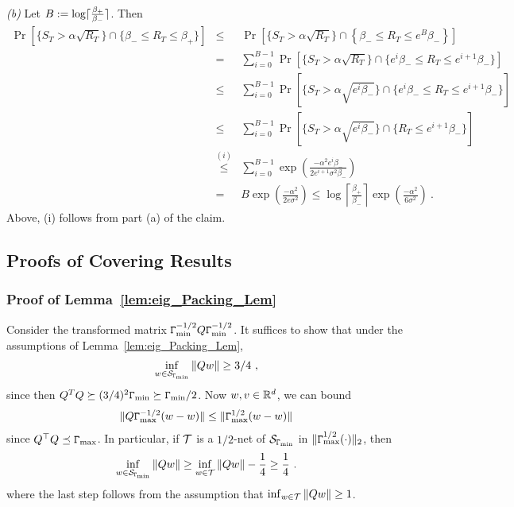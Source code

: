 	\emph{(b) }  Let $B := \log\lceil\frac{\beta_+}{\beta_-}\rceil$. Then
		\begin{eqnarray*}
		\Pr\left[\{S_T > \alpha\sqrt{R_T}\} \cap \{\beta_- \le R_T \le \beta_+\}\right] &\le& \Pr\left[\{S_T > \alpha\sqrt{R_T}\} \cap \left\{\beta_- \le R_T \le e^B\beta_- \right\}\right]\\
		&=& \sum_{i=0}^{B-1}\Pr[\{S_T > \alpha\sqrt{R_T}\} \cap \{e^i\beta_- \le R_T \le e^{i + 1}\beta_-\}]\\
		&\le& \sum_{i=0}^{B-1}\Pr[\{S_T > \alpha\sqrt{e^{i}\beta_-}\} \cap \{e^{i} \beta_- \le R_T \le e^{i+1}\beta_- \}]\\
		&\le& \sum_{i=0}^{B-1}\Pr[\{S_T > \alpha\sqrt{e^{i}\beta_-}\} \cap \{R_T \le e^{i+1}\beta_- \}]\\
	  &\stackrel{(i)}{\le}& \sum_{i=0}^{B-1}\exp\left(\frac{-\alpha^2 e^i\beta_-}{2e^{i + 1}\sigma^2\beta_-}\right)\\
		&=& B\exp\left(\frac{-\alpha^2}{2e \sigma^2}\right) \leq  \log\left\lceil\frac{\beta_+}{\beta_-} \right \rceil \exp\left(\frac{-\alpha^2}{ 6\sigma^2}\right)~.
		\end{eqnarray*}
		Above, (i) follows from part (a) of the claim.
\subsection{Proofs of Covering Results}
\subsubsection{Proof of Lemma~\ref{lem:eig_Packing_Lem}\label{sec:proof_lem_eig_pack}} Consider the transformed matrix $\mathtt{\Gamma}_{\min}^{-1/2}Q\mathtt{\Gamma}_{\min}^{-1/2}$. It suffices to show that under the assumptions of Lemma~\ref{lem:eig_Packing_Lem}, 
\begin{eqnarray}
\inf_{w\in \mathcal{S}_{\mathtt{\Gamma}_{\min}}} \|Qw\| \ge 3/4~,
\end{eqnarray}
since then $Q^TQ \succeq (3/4)^2\mathtt{\Gamma}_{\min} \succeq \mathtt{\Gamma}_{\min}/2$. Now $w, v \in \mathbb{R}^{d}$, we can bound
\begin{eqnarray*}
\|Q\mathtt{\Gamma}_{\max}^{-1/2}(w-w)\| \le \|\mathtt{\Gamma}_{\max}^{1/2}(w-w)\| 
\end{eqnarray*}
since $Q^\top Q \preceq \mathtt{\Gamma}_{\max}$. In particular, if $\mathcal{T}$ is a $1/2$-net of $\mathcal{S}_{\mathtt{\Gamma}_{\min}}$ in $\|\mathtt{\Gamma}_{\max}^{1/2}(\cdot)\|_2$, then 
\begin{eqnarray*}
\inf_{w \in \mathcal{S}_{\mathtt{\Gamma}_{\min}}} \|Qw\| \ge \inf_{w \in \mathcal{T}} \|Q w\| - \frac{1}{4} \ge \frac{1}{4}~.
\end{eqnarray*} 
where the last step follows from the assumption that $\inf_{w\in \mathcal{T}} \|Qw\| \ge 1$. 



